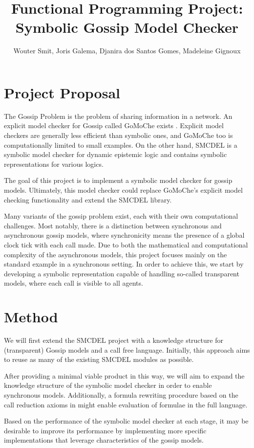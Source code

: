 \documentclass[12pt,a4paper]{article}
\title{Functional Programming Project:\\ Symbolic Gossip Model Checker}
\author{Wouter Smit, Joris Galema, Djanira dos Santos Gomes, Madeleine Gignoux}
\date{ }
\begin{document}
\maketitle

\section*{Project Proposal}
The Gossip Problem is the problem of sharing information in a network. An explicit model checker for Gossip called GoMoChe exists \cite{gattinger2023gomoche}. Explicit model checkers are generally less efficient than symbolic ones, and GoMoChe too is computationally limited to small examples. On the other hand, SMCDEL is a symbolic model checker for dynamic epistemic logic and contains symbolic representations for various logics.

The goal of this project is to implement a symbolic model checker for gossip models. Ultimately, this model checker could replace GoMoChe's explicit model checking functionality and extend the SMCDEL library.

Many variants of the gossip problem exist, each with their own computational challenges. Most notably, there is a distinction between synchronous and asynchronous gossip models, where synchronicity means the presence of a global clock tick with each call made. Due to both the mathematical and computational complexity of the asynchronous models, this project focuses mainly on the standard example in a synchronous setting. In order to achieve this, we start by developing a symbolic representation capable of handling so-called transparent models, where each call is visible to all agents.

\section{Method}
We will first extend the SMCDEL project with a knowledge structure for (transparent) Gossip models and a call free language. Initially, this approach aims to reuse as many of the existing SMCDEL modules as possible.

After providing a minimal viable product in this way, we will aim to expand the knowledge structure of the symbolic model checker in order to enable synchronous models. Additionally, a formula rewriting procedure based on the call reduction axioms in \cite{van_ditmarsch_logic_2020} might enable evaluation of formulae in the full language.

Based on the performance of the symbolic model checker at each stage, it may be desirable to improve its performance by implementing more specific implementations that leverage characteristics of the gossip models.
\end{document}
